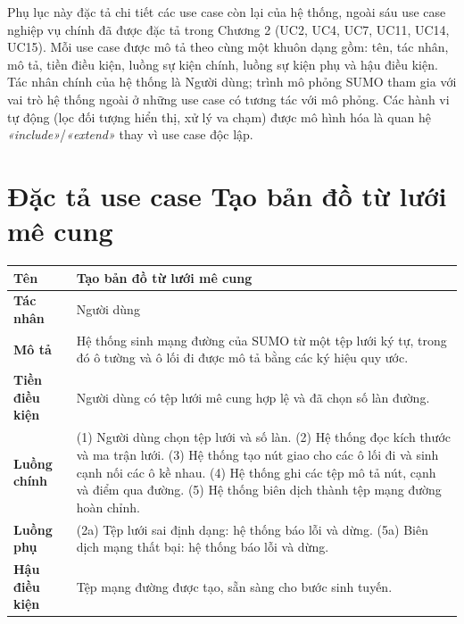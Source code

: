 \documentclass[../DoAn.tex]{subfiles}
\begin{document}
Phụ lục này đặc tả chi tiết các use case còn lại của hệ thống, ngoài sáu use case
nghiệp vụ chính đã được đặc tả trong Chương 2 (UC2, UC4, UC7, UC11, UC14, UC15).
Mỗi use case được mô tả theo cùng một khuôn dạng gồm: tên, tác nhân, mô tả, tiền
điều kiện, luồng sự kiện chính, luồng sự kiện phụ và hậu điều kiện. Tác nhân
chính của hệ thống là Người dùng; trình mô phỏng \gls{SUMO} tham gia với vai trò
hệ thống ngoài ở những use case có tương tác với mô phỏng. Các hành vi tự động
(lọc đối tượng hiển thị, xử lý va chạm) được mô hình hóa là quan hệ
\textit{«include»}/\textit{«extend»} thay vì use case độc lập.

\newcommand{\uctable}[7]{%
    \noindent
    \begin{tabular}{|p{0.22\textwidth}|p{0.70\textwidth}|}
        \hline
        \textbf{Tên}            & #1 \\ \hline
        \textbf{Tác nhân}       & #2 \\ \hline
        \textbf{Mô tả}          & #3 \\ \hline
        \textbf{Tiền điều kiện} & #4 \\ \hline
        \textbf{Luồng chính}    & #5 \\ \hline
        \textbf{Luồng phụ}      & #6 \\ \hline
        \textbf{Hậu điều kiện}  & #7 \\
        \hline
    \end{tabular}
    \vspace{1em}
}

\section{Đặc tả use case Tạo bản đồ từ lưới mê cung}

\uctable
    {Tạo bản đồ từ lưới mê cung}
    {Người dùng}
    {Hệ thống sinh mạng đường của \gls{SUMO} từ một tệp lưới ký tự, trong đó ô tường và ô lối đi được mô tả bằng các ký hiệu quy ước.}
    {Người dùng có tệp lưới mê cung hợp lệ và đã chọn số làn đường.}
    {(1) Người dùng chọn tệp lưới và số làn. (2) Hệ thống đọc kích thước và ma trận lưới. (3) Hệ thống tạo nút giao cho các ô lối đi và sinh cạnh nối các ô kề nhau. (4) Hệ thống ghi các tệp mô tả nút, cạnh và điểm qua đường. (5) Hệ thống biên dịch thành tệp mạng đường hoàn chỉnh.}
    {(2a) Tệp lưới sai định dạng: hệ thống báo lỗi và dừng. (5a) Biên dịch mạng thất bại: hệ thống báo lỗi và dừng.}
    {Tệp mạng đường được tạo, sẵn sàng cho bước sinh tuyến.}
\end{document}
